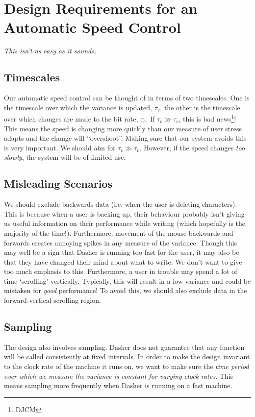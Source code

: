 \documentclass[a4paper,11pt,notitlepage]{article}
\begin{document}
\section{Design Requirements for an Automatic Speed Control}

\emph{This isn't as easy as it sounds.}

\subsection{Timescales}\label{item:time} 

Our automatic speed control can be thought of in terms of two
timescales. One is the timescale over which the variance is updated,
$\tau_v$, the other is the timescale over which changes are made to
the bit rate, $\tau_c$. If $\tau_v \gg \tau_c$, this is bad
news\footnote{DJCM}! This means the speed is changing more quickly
than our measure of user stress adapts and the change will
``overshoot''. Making sure that our system avoids this is very
important. We should aim for $\tau_c \gg \tau_v$. However, if the
speed changes \emph{too slowly}, the system will be of limited use.

\subsection{Misleading Scenarios}\label{item:back} 

We should exclude backwards data (i.e. when the user is deleting
characters). This is because when a user is backing up, their
behaviour probably isn't giving us useful information on their
performance while writing (which hopefully is the majority of the
time!). Furthermore, movement of the mouse backwards and forwards
creates annoying spikes in any measure of the variance. Though this
may well be a sign that Dasher is running too fast for the user, it may
also be that they have changed their mind about what to write. We
don't want to give too much emphasis to this. Furthermore, a user in
trouble may spend a lot of time `scrolling' vertically. Typically,
this will result in a low variance and could be mistaken for
\emph{good} performance! To avoid this, we should also exclude data in
the forward-vertical-scrolling region.

\subsection{Sampling}\label{item:samp} 

The design also involves sampling. Dasher does not guarantee that any
function will be called consistently at fixed intervals. In order to
make the design invariant to the clock rate of the machine it runs on,
we want to make sure the \emph{time period over which we measure the
variance is constant for varying clock rates}. This means sampling
more frequently when Dasher is running on a fast machine.
\end{document}

